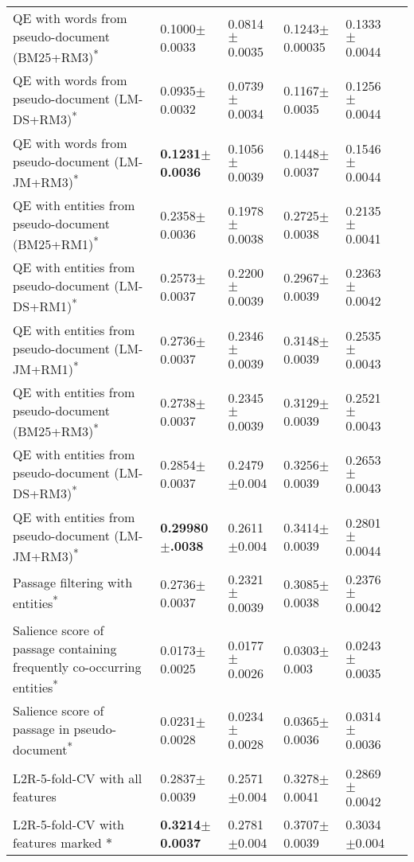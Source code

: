 \documentclass[sigconf,anonymous,review]{acmart}
\begin{document}
\begin{table*}
{\begin{tabular}{lp{2cm}p{2cm}p{2cm}p{2cm}l}
QE with words from pseudo-document (BM25+RM3)\textsuperscript{*}&	0.1000$\pm$0.0033&	0.0814$\pm$0.0035&	0.1243$\pm$0.00035&	
0.1333$\pm$0.0044 \\

QE with words from pseudo-document (LM-DS+RM3)\textsuperscript{*}&	0.0935$\pm$0.0032&	0.0739$\pm$0.0034&	0.1167$\pm$0.0035&	
0.1256$\pm$0.0044 \\

QE with words from pseudo-document (LM-JM+RM3)\textsuperscript{*}&	\textbf{0.1231$\pm$0.0036}&	0.1056$\pm$0.0039&	0.1448$\pm$0.0037&	
0.1546$\pm$0.0044 \\
\midrule

QE with entities from pseudo-document (BM25+RM1)\textsuperscript{*}&	0.2358$\pm$0.0036&	0.1978$\pm$0.0038&	0.2725$\pm$0.0038&	
0.2135$\pm$0.0041 \\

QE with entities from pseudo-document (LM-DS+RM1)\textsuperscript{*}&	0.2573$\pm$0.0037&	0.2200$\pm$0.0039&	0.2967$\pm$0.0039&	
0.2363$\pm$0.0042 \\

QE with entities from pseudo-document (LM-JM+RM1)\textsuperscript{*}&	0.2736$\pm$0.0037&	0.2346$\pm$0.0039&	0.3148$\pm$0.0039&	
0.2535$\pm$0.0043 \\

QE with entities from pseudo-document (BM25+RM3)\textsuperscript{*}&	0.2738$\pm$0.0037&	0.2345$\pm$0.0039&	0.3129$\pm$0.0039&	
0.2521$\pm$0.0043 \\

QE with entities from pseudo-document (LM-DS+RM3)\textsuperscript{*}&	0.2854$\pm$0.0037&	0.2479$\pm$0.004&	0.3256$\pm$0.0039&	
0.2653$\pm$0.0043 \\

QE with entities from pseudo-document (LM-JM+RM3)\textsuperscript{*}&	\textbf{0.29980$\pm$.0038}&	0.2611$\pm$0.004&	0.3414$\pm$0.0039&	
0.2801$\pm$0.0044 \\

Passage filtering with entities\textsuperscript{*} &	0.2736$\pm$0.0037&	0.2321$\pm$0.0039&	0.3085$\pm$0.0038&	
0.2376$\pm$0.0042 \\

Salience score of passage containing frequently co-occurring entities\textsuperscript{*}&	0.0173$\pm$0.0025&	0.0177$\pm$0.0026&	0.0303$\pm$0.003&	
0.0243$\pm$0.0035 \\

Salience score of passage in pseudo-document\textsuperscript{*}&	0.0231$\pm$0.0028&	0.0234$\pm$0.0028&	0.0365$\pm$0.0036&	
0.0314$\pm$0.0036 \\
\midrule
L2R-5-fold-CV with all features & 0.2837$\pm$0.0039&	0.2571$\pm$0.004&	0.3278$\pm$0.0041&	
0.2869$\pm$0.0042 \\

\midrule
L2R-5-fold-CV with features marked $*$ & \textbf{0.3214$\pm$0.0037}&	0.2781$\pm$0.004&	0.3707$\pm$0.0039&	
0.3034$\pm$0.004 \\

			
  \bottomrule
\end{tabular}}
\end{table*}
\end{document}
